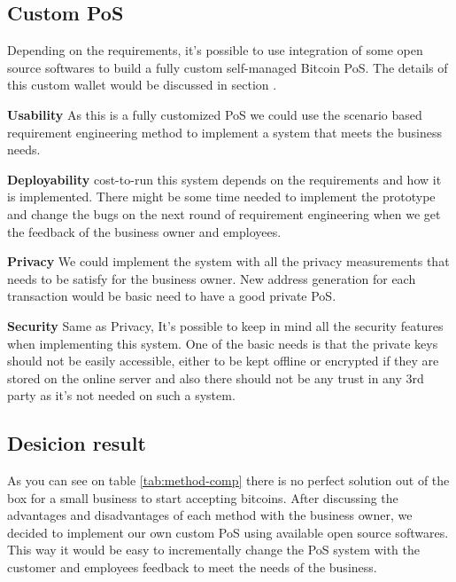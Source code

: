 \subsection{Custom PoS}
Depending on the requirements, it's possible to use integration of some open source softwares to build a fully custom self-managed Bitcoin PoS. The details of this custom wallet would be discussed in section .

 \textbf{Usability}
As this is a fully customized PoS we could use the scenario based requirement engineering method to implement a system that meets the business needs.

 \textbf{Deployability}
cost-to-run this system depends on the requirements and how it is implemented. There might be some time needed to implement the prototype and change the bugs on the next round of requirement engineering when we get the feedback of the business owner and employees.

 \textbf{Privacy}
We could implement the system with all the privacy measurements that needs to be satisfy for the business owner. New address generation for each transaction would be basic need to have a good private PoS.

 \textbf{Security}
Same as Privacy, It's possible to keep in mind all the security features when implementing this system. One of the basic needs is that the private keys should not be easily accessible, either to be kept offline or encrypted if they are stored on the online server and also there should not be any trust in any 3rd party as it's not needed on such a system.

\subsection{Desicion result}
As you can see on table \ref{tab:method-comp} there is no perfect solution out of the box for a small business to start accepting bitcoins. After discussing the advantages and disadvantages of each method with the business owner, we decided to implement our own custom PoS using available open source softwares. This way it would be easy to incrementally change the PoS system with the customer and employees feedback to meet the needs of the business.

